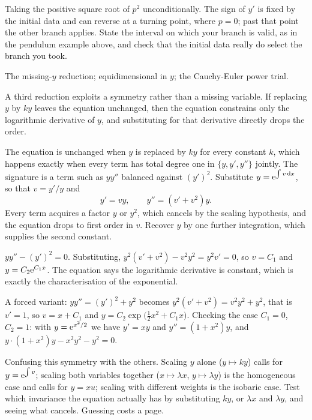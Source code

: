 \begin{trap}
Taking the positive square root of $p^{2}$ unconditionally. The sign of $y'$ is fixed by the initial data and can reverse at a turning point, where $p=0$; past that point the other branch applies. State the interval on which your branch is valid, as in the pendulum example above, and check that the initial data really do select the branch you took.
\end{trap}

\begin{seealsob}The missing-$y$ reduction; equidimensional in $y$; the Cauchy-Euler power trial.\end{seealsob}

A third reduction exploits a symmetry rather than a missing variable. If replacing $y$ by $ky$ leaves the equation unchanged, then the equation constrains only the logarithmic derivative of $y$, and substituting for that derivative directly drops the order.

\cue The equation is unchanged when $y$ is replaced by $ky$ for every constant $k$, which happens exactly when every term has total degree one in $\{y,y',y''\}$ jointly. The signature is a term such as $yy''$ balanced against $(y')^{2}$.
\method Substitute $y=\mathrm{e}^{\int v\,\mathrm{d} x}$, so that $v=y'/y$ and
\[y'=vy,\qquad y''=(v'+v^{2})y.\]
Every term acquires a factor $y$ or $y^{2}$, which cancels by the scaling hypothesis, and the equation drops to first order in $v$. Recover $y$ by one further integration, which supplies the second constant.

\begin{worked}
$yy''-(y')^{2}=0$. Substituting, $y^{2}(v'+v^{2})-v^{2}y^{2}=y^{2}v'=0$, so $v=C_1$ and $y=C_2\mathrm{e}^{C_1x}$. The equation says the logarithmic derivative is constant, which is exactly the characterisation of the exponential.

A forced variant: $yy''=(y')^{2}+y^{2}$ becomes $y^{2}(v'+v^{2})=v^{2}y^{2}+y^{2}$, that is $v'=1$, so $v=x+C_1$ and $y=C_2\exp\bigl(\tfrac12x^{2}+C_1x\bigr)$. Checking the case $C_1=0$, $C_2=1$: with $y=\mathrm{e}^{x^{2}/2}$ we have $y'=xy$ and $y''=(1+x^{2})y$, and $y\cdot(1+x^{2})y-x^{2}y^{2}-y^{2}=0$.
\end{worked}

\begin{trap}
Confusing this symmetry with the others. Scaling $y$ alone ($y\mapsto ky$) calls for $y=\mathrm{e}^{\int v}$; scaling both variables together ($x\mapsto\lambda x$, $y\mapsto\lambda y$) is the homogeneous case and calls for $y=xu$; scaling with different weights is the isobaric case. Test which invariance the equation actually has by substituting $ky$, or $\lambda x$ and $\lambda y$, and seeing what cancels. Guessing costs a page.
\end{trap}

